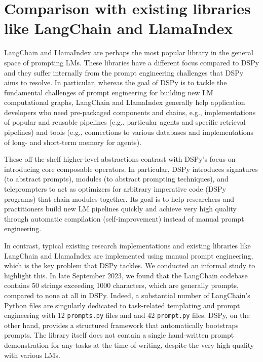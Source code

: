             

            




\section{Comparison with existing libraries like LangChain and LlamaIndex}\label{sec:dspy_vs_langchain}

LangChain and LlamaIndex are perhaps the most popular library in the general space of prompting LMs. These libraries have a different focus compared to DSPy and they suffer internally from the prompt engineering challenges that DSPy aims to resolve. In particular, whereas the goal of DSPy is to tackle the fundamental challenges of prompt engineering for building new LM computational graphs, LangChain and LlamaIndex generally help application developers who need pre-packaged components and chains, e.g., implementations of popular and reusable pipelines (e.g., particular agents and specific retrieval pipelines) and tools (e.g., connections to various databases and implementations of long- and short-term memory for agents).

These off-the-shelf higher-level abstractions contrast with DSPy's focus on introducing core composable operators. In particular, DSPy introduces signatures (to abstract prompts), modules (to abstract prompting techniques), and teleprompters to act as optimizers for arbitrary imperative code (DSPy programs) that chain modules together. Its goal is to help researchers and practitioners build new LM pipelines quickly and achieve very high quality through automatic compilation (self-improvement) instead of manual prompt engineering.

In contrast, typical existing research implementations and existing libraries like LangChain and LlamaIndex are implemented using manual prompt engineering, which is the key problem that DSPy tackles. We conducted an informal study to highlight this. In late September 2023, we found that the LangChain codebase contains 50 strings exceeding 1000 characters, which are generally prompts, compared to none at all in DSPy.  Indeed, a substantial number of LangChain's Python files are singularly dedicated to task-related templating and prompt engineering with 12 \texttt{prompts.py} files and and 42 \texttt{prompt.py} files. DSPy, on the other hand, provides a structured framework that automatically bootstraps prompts. The library itself does not contain a single hand-written prompt demonstration for any tasks at the time of writing, despite the very high quality with various LMs.


